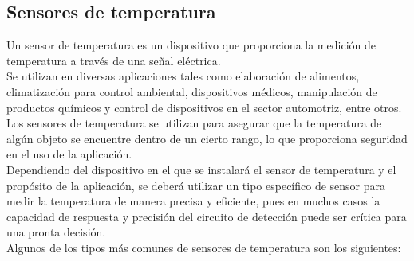 	\subsection{Sensores de temperatura}
	Un sensor de temperatura es un dispositivo que proporciona la medición de temperatura a través de una señal eléctrica. \\
		
	Se utilizan en diversas aplicaciones tales como elaboración de alimentos, climatización para control ambiental, dispositivos médicos, manipulación de productos químicos y control de dispositivos en el sector automotriz, entre otros. \\
		
	Los sensores de temperatura se utilizan para asegurar que la temperatura de algún objeto se encuentre dentro de un cierto rango, lo que proporciona seguridad en el uso de la aplicación. \\
		
	Dependiendo del dispositivo en el que se instalará el sensor de temperatura y el propósito de la aplicación, se deberá utilizar un tipo específico de sensor para medir la temperatura de manera precisa y eficiente, pues en muchos casos la capacidad de respuesta y precisión del circuito de detección puede ser crítica para una pronta decisión.\\
	
	Algunos de los tipos más comunes de sensores de temperatura son los siguientes:
	
